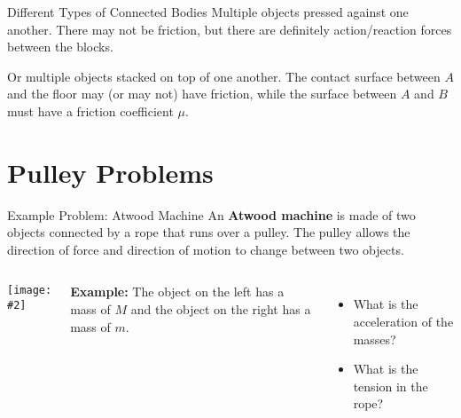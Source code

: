 \documentclass[12pt,compress,aspectratio=169]{beamer}
\newcommand{\pic}[2]{\texttt{[image: \#2]}}
\newcommand{\mb}[1]{\ensuremath\mathbf{#1}}
\begin{document}
\begin{frame}{Different Types of Connected Bodies}
  Multiple objects pressed against one another. There may not be friction, but
  there are definitely action/reaction forces between the blocks.
  \begin{center}
  \end{center}
  Or multiple objects stacked on top of one another. The contact surface between
  $A$ and the floor may (or may not) have friction, while the surface between
  $A$ and $B$ must have a friction coefficient $\mu$.
  \begin{center}
  \end{center}
\end{frame}


\section{Pulley Problems}

\begin{frame}{Example Problem: Atwood Machine}
  An \textbf{Atwood machine} is made of two objects connected by a rope that
  runs over a pulley. The pulley allows the direction of force and direction
  of motion to change between two objects.
  \begin{columns}
    \begin{center}
      \pic{1}{graphics/pulley_prob_2}
    \end{center}
    \textbf{Example:} The object on the left has a mass of $M$ and the object
    on the right has a mass of $m$.
    \begin{itemize}
    \item What is the acceleration of the masses?
    \item What is the tension in the rope?
    \end{itemize}
  \end{columns}
\end{frame}
\end{document}
